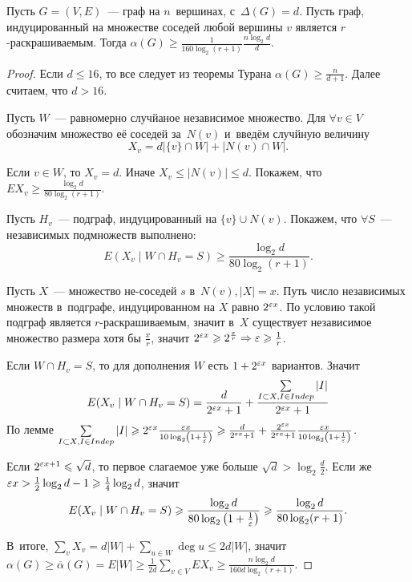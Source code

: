 \documentclass{article}
\begin{document}
\begin{theorem}[Алон]
	Пусть $G = (V, E)$~--- граф на $n$~вершинах, с~$\Delta(G) = d$. Пусть граф,
	индуцированный на множестве соседей любой вершины $v$ является
	$r$-раскрашиваемым. Тогда $\alpha(G) \ge \frac{1}{160 \log_2 (r + 1)} \frac{n
	\log_2 d}{d}$.
\end{theorem}
\begin{proof}
	Если $d \le 16$, то все следует из теоремы Турана $\alpha(G) \ge \frac{n}{d +
	1}$. Далее считаем, что $d > 16$.

	Пусть $W$~--- равномерно случйаное независимое множество. Для $\forall v \in
	V$ обозначим множество её соседей за~$N(v)$ и~введём случйную величину
	$$X_v = d|\{v\} \cap W| + |N(v) \cap W|.$$

	Если $v \in W$, то $X_v = d$. Иначе $X_v \le |N(v)| \le d$. Покажем, что $EX_v
	\ge \frac{\log_2 d}{80 \log_2 (r+1)}$.

	Пусть $H_v$~--- подграф, индуцированный на $\{v\} \cup N(v)$. Покажем, что
	$\forall S$~--- независимых подмножеств выполнено:
	$$ E(X_v \mid W \cap H_v = S) \ge \frac{\log_2 d}{80 \log_2 (r + 1)}. $$

	Пусть $X$~--- множество не-соседей $s$ в~$N(v), |X| = x$. Путь число
	независимых множеств в~подграфе, индуцированном на $X$ равно $2^{\varepsilon x}$. По
	условию такой подграф является $r$-раскрашиваемым, значит в~$X$ существует
	независимое множество размера хотя бы $\frac{x}{r}$, значит $2^{\varepsilon x} \geqslant
	2^{\frac{x}{r}} \Rightarrow \varepsilon \geqslant \frac{1}{r}$.

	Если $W \cap H_v = S$, то для дополнения $W$ есть $1 + 2^{\varepsilon x}$ вариантов.
	Значит
	$$
		E(X_v \mid W \cap H_v = S) = \frac{d}{2^{\varepsilon x} + 1} + \frac{\sum\limits_{I
		\subset X, I \in Indep}|I|}{2^{\varepsilon x} + 1}
	$$
	По лемме $\sum\limits_{I\subset X, I \in Indep} |I| \geqslant 2^{\varepsilon x} \frac{\varepsilon
	x}{10 \log_2 \left( 1 + \frac{1}{\varepsilon}\right)} \geqslant \frac{d}{2^{\varepsilon x} + 1} +
	\frac{2^{\varepsilon x}}{2^{\varepsilon x} + 1} \frac{\varepsilon x}{10 \log_2 \left( 1 +
	\frac{1}{\varepsilon} \right)}$.

	Если $2^{\varepsilon x + 1} \leqslant \sqrt{d}$, то первое слагаемое уже больше $\sqrt{d} >
	\log_2 \frac{d}{2}$. Если же $\varepsilon x > \frac{1}{2} \log_2 d - 1 \geqslant
	\frac{1}{4} \log_2 d$, значит
	$$
		E(X_v \mid W \cap H_v = S) \geqslant \frac{\log_2 d}{80 \log_2
		\left( 1 + \frac{1}{\varepsilon} \right)} \geqslant \frac{\log_2d}{80 \log_2 (r + 1)}.
	$$

	В~итоге, $\sum\limits_v X_v = d|W| + \sum\limits_{u \in W} \deg u \le 2d|W|$,
	значит $\alpha(G) \ge \overline\alpha(G) = E|W| \ge \frac{1}{2d} \sum\limits_{v
	\in V} EX_v \ge \frac{n \log_2 d}{160 d \log_2 (r + 1)}$.
\end{proof}
\end{document}
